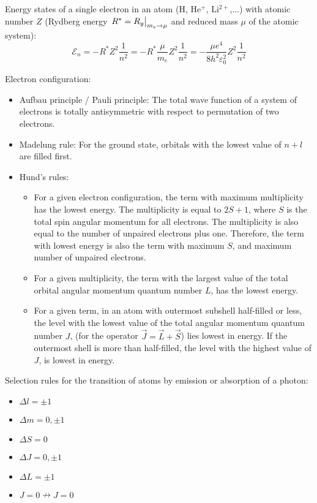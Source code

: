 			\noindent
			Energy states of a single electron in an atom ($\mathrm{H}$, $\mathrm{He^{+}}$, $\mathrm{Li^{2+}}$,...) with atomic number $Z$ (Rydberg energy $\eval{R^*=R_y}_{m_e \to \mu}$ and reduced mass $\mu$ of the atomic system):
			\begin{equation}
				\mathcal{E}_n = -R^* Z^2 \frac{1}{n^2} = -R^* \frac{\mu}{m_e} Z^2 \frac{1}{n^2} = - \frac{\mu e^4}{8 h^2 \varepsilon_0^2} Z^2 \frac{1}{n^2}
			\end{equation}

			\noindent
			Electron configuration:
			\begin{itemize}
				\item Aufbau principle / Pauli principle: The total wave function of a system of electrons is totally antisymmetric with respect to permutation of two electrons.
				\item Madelung rule: For the ground state, orbitals with the lowest value of $n+l$ are filled first.
				\item Hund's rules:
					\begin{itemize}
						\item For a given electron configuration, the term with maximum multiplicity has the lowest energy. The multiplicity is equal to $2S+1$, where $S$ is the total spin angular momentum for all electrons. The multiplicity is also equal to the number of unpaired electrons plus one. Therefore, the term with lowest energy is also the term with maximum $S$, and maximum number of unpaired electrons.
						\item For a given multiplicity, the term with the largest value of the total orbital angular momentum quantum number  $L$, has the lowest energy.
						\item For a given term, in an atom with outermost subshell half-filled or less, the level with the lowest value of the total angular momentum quantum number  $J$, (for the operator $\vec{J} = \vec{L} + \vec{S}$) lies lowest in energy. If the outermost shell is more than half-filled, the level with the highest value of  $J$, is lowest in energy.
					\end{itemize}
			\end{itemize}

			\noindent
			Selection rules for the transition of atoms by emission or absorption of a photon:
			\begin{itemize}
				\item $\Delta l = \pm 1$
				\item $\Delta m = 0, \pm 1$
				\item $\Delta S = 0$
				\item $\Delta J = 0, \pm 1$
				\item $\Delta L = \pm 1$
				\item $J=0 \nrightarrow J=0$
			\end{itemize}

